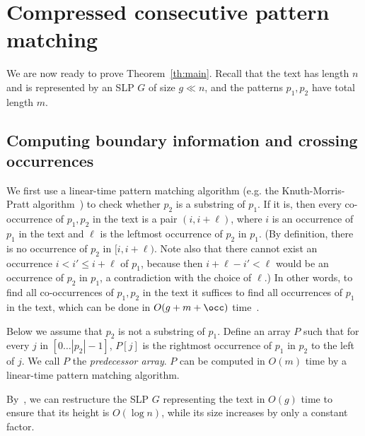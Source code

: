  
\section{Compressed consecutive pattern matching}
\label{pmgapped:sec:consec}
We are now ready to prove Theorem~\ref{th:main}. Recall that the text has length $n$ and is represented by an SLP $G$ of size $g \ll n$, and the patterns $p_1,p_2$ have total length $m$.

\subsection{Computing boundary information and crossing occurrences}
\label{pmgapped:sec:boundary}
We first use a linear-time pattern matching algorithm (e.g. the Knuth-Morris-Pratt algorithm~\cite{JoC/KnuthMorrisPratt}) to check whether $p_2$ is a substring of $p_1$. If it is, then every co-occurrence of $p_1, p_2$ in the text is a pair $(i,i+\ell)$, where $i$ is an occurrence of $p_1$ in the text and $\ell$ is the leftmost occurrence of $p_2$ in $p_1$. (By definition, there is no occurrence of $p_2$ in $[i,i+\ell)$. Note also that there cannot exist an occurrence $i < i' \le i+\ell$ of $p_1$, because then $i+\ell-i' < \ell$ would be an occurrence of $p_2$ in $p_1$, a contradiction with the choice of $\ell$.) In other words, to find all co-occurrences of $p_1,p_2$ in the text it suffices to find all occurrences of $p_1$ in the text, which can be done in $O(g+m+\occ)$ time~\cite{DBLP:conf/soda/GanardiG22}.

Below we assume that $p_2$ is not a substring of $p_1$. Define an array $P$ such that for every $j$ in $[0\dots |p_2|-1]$, $P[j]$ is the rightmost occurrence of $p_1$ in $p_2$ to the left of $j$. We call $P$ the \emph{predecessor array}. $P$ can be computed in $O(m)$ time by a linear-time pattern matching algorithm.

By~\cite{DBLP:conf/focs/GanardiJL19}, we can restructure the SLP $G$ representing the text in $O(g)$ time to ensure that its height is $O(\log n)$, while its size increases by only a constant factor. 

